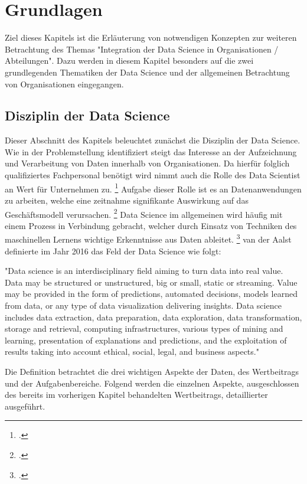 \chapter[Grundlagen]{Grundlagen}

Ziel dieses Kapitels ist die Erläuterung von notwendigen Konzepten zur weiteren Betrachtung des Themas "Integration der Data Science in Organisationen / Abteilungen".
Dazu werden in diesem Kapitel besonders auf die zwei grundlegenden Thematiken der Data Science und der allgemeinen Betrachtung von Organisationen eingegangen.

\section{Disziplin der Data Science}

Dieser Abschnitt des Kapitels beleuchtet zunächst die Disziplin der Data Science.
Wie in der Problemstellung identifiziert steigt das Interesse an der Aufzeichnung und Verarbeitung von Daten innerhalb von Organisationen. 
Da hierfür folglich qualifiziertes Fachpersonal benötigt wird nimmt auch die Rolle des Data Scientist an Wert für Unternehmen zu. \footcite[prenote][postnote]{the role of data scientists}
Aufgabe dieser Rolle ist es an Datenanwendungen zu arbeiten, welche eine zeitnahme signifikante Auswirkung auf das Geschäftsmodell verursachen. \footcite[prenote][postnote]{aim of data scientists}
Data Science im allgemeinen wird häufig mit einem Prozess in Verbindung gebracht, welcher durch Einsatz von Techniken des maschinellen Lernens wichtige Erkenntnisse aus Daten ableitet. \footcite[prenote][postnote]{data science often refers}
van der Aalst definierte im Jahr 2016 das Feld der Data Science wie folgt: \cite[prenote][postnote]{data science definition}

"Data science is an interdisciplinary ﬁeld aiming to turn data into real value.
Data may be structured or unstructured, big or small, static or streaming.
Value may be provided in the form of predictions, automated decisions, models learned from data, or any type of data visualization delivering insights.
Data science includes data extraction, data preparation, data exploration, data transformation, storage and retrieval, computing infrastructures, various types of mining and learning, presentation of explanations and predictions, and the exploitation of results taking into account ethical, social, legal, and business aspects."

Die Definition betrachtet die drei wichtigen Aspekte der Daten, des Wertbeitrags und der Aufgabenbereiche.
Folgend werden die einzelnen Aspekte, ausgeschlossen des bereits im vorherigen Kapitel behandelten Wertbeitrags, detaillierter ausgeführt.

